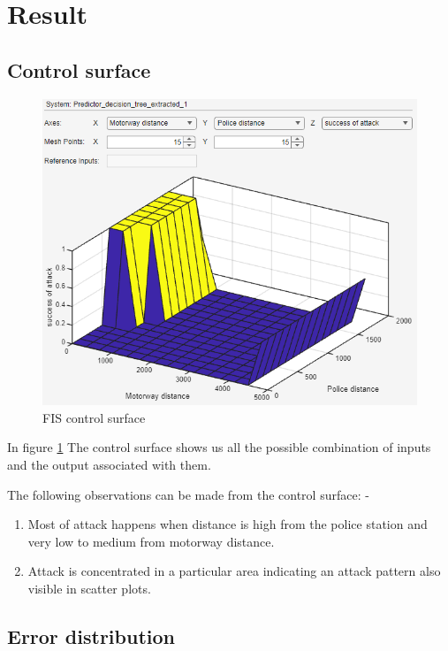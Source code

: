 \documentclass[10pt, conference, compsocconf]{IEEEtran}
\begin{document}
\section{Result}

\subsection{Control surface}
	\begin{figure}[h!]
	\centering
	\includegraphics[width=\linewidth]{Fuzzy_final_control_surface.png}
	\caption{FIS control surface}
	\label{FISCS}
\end{figure}

In figure \ref{FISCS} The control surface shows us all the possible combination of inputs and the output associated with them.

The following observations can be made from the control surface: -
\begin{enumerate}
	\item Most of attack happens when distance is high from the police station and very low to medium from motorway distance.
	\item Attack is concentrated in a particular area indicating an attack pattern also visible in scatter plots. 
\end{enumerate} 

\subsection{Error distribution}
\end{document}
